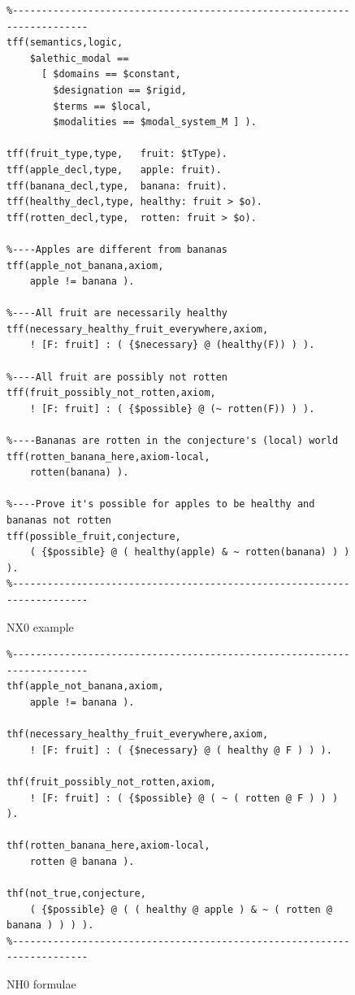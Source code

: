 \documentclass{ceurart}
\begin{document}
\begin{figure}[h!]
\small
{}
\begin{verbatim}
%------------------------------------------------------------------------
tff(semantics,logic,
    $alethic_modal == 
      [ $domains == $constant,
        $designation == $rigid,
        $terms == $local,
        $modalities == $modal_system_M ] ).

tff(fruit_type,type,   fruit: $tType).
tff(apple_decl,type,   apple: fruit).
tff(banana_decl,type,  banana: fruit).
tff(healthy_decl,type, healthy: fruit > $o).
tff(rotten_decl,type,  rotten: fruit > $o).

%----Apples are different from bananas
tff(apple_not_banana,axiom,
    apple != banana ).

%----All fruit are necessarily healthy
tff(necessary_healthy_fruit_everywhere,axiom,
    ! [F: fruit] : ( {$necessary} @ (healthy(F)) ) ).

%----All fruit are possibly not rotten
tff(fruit_possibly_not_rotten,axiom,
    ! [F: fruit] : ( {$possible} @ (~ rotten(F)) ) ).

%----Bananas are rotten in the conjecture's (local) world
tff(rotten_banana_here,axiom-local,
    rotten(banana) ).

%----Prove it's possible for apples to be healthy and bananas not rotten
tff(possible_fruit,conjecture,
    ( {$possible} @ ( healthy(apple) & ~ rotten(banana) ) ) ).
%------------------------------------------------------------------------
\end{verbatim}
\caption{NX0 example}
\label{NX0Example}
\end{figure}

\begin{figure}[h!]
\small
{}
\begin{verbatim}
%------------------------------------------------------------------------
thf(apple_not_banana,axiom,
    apple != banana ).

thf(necessary_healthy_fruit_everywhere,axiom,
    ! [F: fruit] : ( {$necessary} @ ( healthy @ F ) ) ).

thf(fruit_possibly_not_rotten,axiom,
    ! [F: fruit] : ( {$possible} @ ( ~ ( rotten @ F ) ) ) ).

thf(rotten_banana_here,axiom-local,
    rotten @ banana ).

thf(not_true,conjecture,
    ( {$possible} @ ( ( healthy @ apple ) & ~ ( rotten @ banana ) ) ) ).
%------------------------------------------------------------------------
\end{verbatim}
\caption{NH0 formulae}
\label{NH0Example}
\end{figure}
\end{document}
